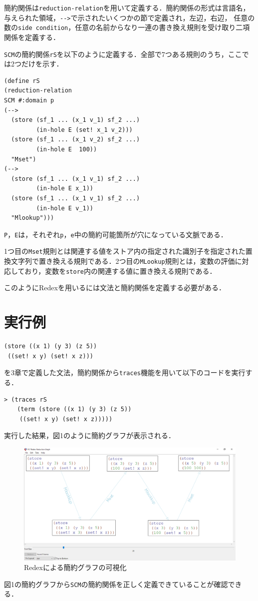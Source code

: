 \documentclass[twocolumn]{jsarticle}
\begin{document}
簡約関係は\verb|reduction-relation|を用いて定義する．簡約関係の形式は言語名，与えられた領域，\verb|-->|で示されたいくつかの節で定義され，左辺，右辺， 任意の数の\verb|side condition|，任意の名前からなり一連の書き換え規則を受け取り二項関係を定義する．

\verb|SCM|の簡約関係\verb|rS|を以下のように定義する．全部で7つある規則のうち，ここでは2つだけを示す．
\begin{verbatim}
(define rS
(reduction-relation
SCM #:domain p
(-->
  (store (sf_1 ... (x_1 v_1) sf_2 ...)
         (in-hole E (set! x_1 v_2)))
  (store (sf_1 ... (x_1 v_2) sf_2 ...)
         (in-hole E  100))
  "Mset")
(-->
  (store (sf_1 ... (x_1 v_1) sf_2 ...)
         (in-hole E x_1))
  (store (sf_1 ... (x_1 v_1) sf_2 ...)
         (in-hole E v_1))
  "Mlookup")))
\end{verbatim}
\verb|P|，\verb|E|は，それぞれ\verb|p|，\verb|e|中の簡約可能箇所が穴になっている文脈である．

1つ目の\verb|Mset|規則とは関連する値をストア内の指定された識別子を指定された置換文字列で置き換える規則である．2つ目の\verb|MLookup|規則とは，変数の評価に対応しており，変数を\verb|store|内の関連する値に置き換える規則である．

このようにRedexを用いるには文法と簡約関係を定義する必要がある．
\section{実行例}
\begin{verbatim}(store ((x 1) (y 3) (z 5))
 ((set! x y) (set! x z)))\end{verbatim}を3章で定義した文法，簡約関係から\verb|traces|機能を用いて以下のコードを実行する．
\begin{verbatim}
> (traces rS 
　  (term (store ((x 1) (y 3) (z 5))
　　 ((set! x y) (set! x z)))))
\end{verbatim}
実行した結果，図1のように簡約グラフが表示される．
\begin{figure}[t]
    \centering
    \includegraphics[scale=0.2]{redex.png}
    \caption{Redexによる簡約グラフの可視化}
    \label{fig:latticemix}
\end{figure} 
図1の簡約グラフから\verb|SCM|の簡約関係を正しく定義できていることが確認できる．
\end{document}
